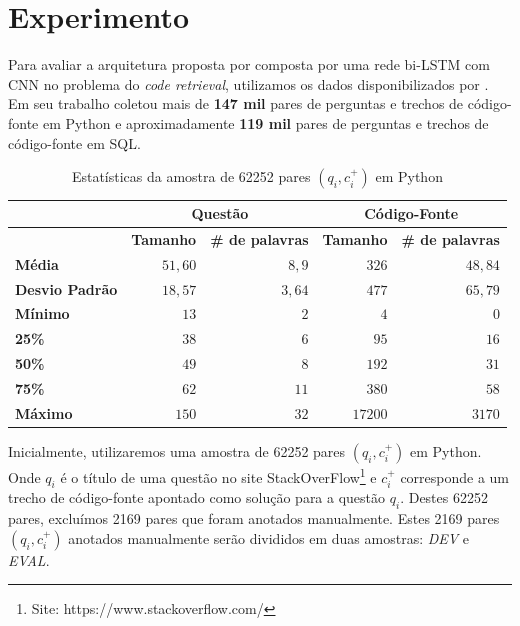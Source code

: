 \documentclass[12pt]{article}
\begin{document}




\section{Experimento}\label{sec:experimento}

Para avaliar a arquitetura proposta por \cite{tan-lstm-qa} composta por uma rede bi-LSTM com CNN no problema do \textit{code retrieval}, utilizamos os dados disponibilizados por \cite{Yao-staqc:2018}. Em seu trabalho \cite{Yao-staqc:2018} coletou mais de \textbf{147 mil} pares de perguntas e trechos de código-fonte em Python e aproximadamente \textbf{119 mil} pares de perguntas e trechos de código-fonte em SQL. 

\begin{table}[h]
\centering
\begin{tabular}{ |p{3cm}|r|r|r|r|  }
\hline
&\multicolumn{2}{|c|}{\textbf{Questão}} & \multicolumn{2}{|c|}{\textbf{Código-Fonte}} \\
\hline
& \textbf{Tamanho} & \textbf{\# de palavras} & \textbf{Tamanho} & \textbf{\# de palavras}\\
 \hline
 \textbf{Média} & $51,60$ & $8,9$ & $326$ & $48,84$\\
 \hline
 \textbf{Desvio Padrão} & $18,57$ & $3,64$ & $477$ & $65,79$\\
 \hline
 \textbf{Mínimo} & $13$ & $2$ & $4$ & $0$\\
 \hline
 \textbf{25\%} & $38$ & $6$ & $95$ & $16$\\
 \hline
 \textbf{50\%} & $49$ & $8$ & $192$ & $31$\\
 \hline
 \textbf{75\%} & $62$ & $11$ & $380$ & $58$\\
 \hline
 \textbf{Máximo} & $150$ & $32$ & $17200$ & $3170$\\
 \hline
\end{tabular}
\caption{Estatísticas da amostra de 62252 pares $(q_{i}, c_{i}^{+})$ em Python}
\label{table:divisao-amostras}
\end{table}



Inicialmente, utilizaremos uma amostra de 62252 pares $(q_{i}, c_{i}^{+})$ em Python. Onde $q_{i}$ é o título de uma questão no site StackOverFlow\footnote{Site: https://www.stackoverflow.com/} e $c_{i}^{+}$ corresponde a um trecho de código-fonte apontado como solução para a questão $q_{i}$. Destes 62252 pares, excluímos 2169 pares que foram anotados manualmente. Estes 2169 pares $(q_{i}, c_{i}^{+})$ anotados manualmente serão divididos em duas amostras: \emph{DEV} e \emph{EVAL}.
\end{document}

